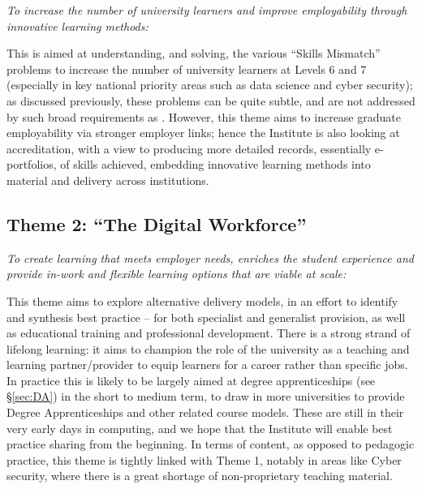 \documentclass[conference]{IEEEtran}
\begin{document}
{\emph{To increase the number of university learners and improve
employability through innovative learning methods:}}\newline

\noindent This is aimed at understanding, and solving, the various
``Skills Mismatch'' problems to increase the number of university
learners at Levels 6 and 7 (especially in key national priority areas
such as data science and cyber security); as discussed previously,
these problems can be quite subtle, and are not addressed by such
broad requirements as \cite[Requirement 2.3.1]{BCS2018a}. However,
this theme aims to increase graduate employability via stronger
employer links; hence the Institute is also looking at accreditation,
with a view to producing more detailed records, essentially
e-portfolios, of skills achieved, embedding innovative learning
methods into material and delivery across institutions.


\subsection{Theme 2: ``The Digital Workforce''}

{\emph{To create learning that meets employer needs, enriches the
student experience and provide in-work and flexible learning options
that are viable at scale:}}\newline

\noindent This theme aims to explore alternative delivery models, in
an effort to identify and synthesis best practice -- for both
specialist and generalist provision, as well as educational training
and professional development. There is a strong strand of lifelong
learning: it aims to champion the role of the university as a teaching
and learning partner/provider to equip learners for a career rather
than specific jobs. In practice this is likely to be largely aimed at
degree apprenticeships (see \S\ref{sec:DA}) in the short to medium
term, to draw in more universities to provide Degree Apprenticeships
and other related course models. These are still in their very early
days in computing, and we hope that the Institute will enable best
practice sharing from the beginning. In terms of content, as opposed
to pedagogic practice, this theme is tightly linked with Theme 1,
notably in areas like Cyber security, where there is a great shortage
of non-proprietary teaching material.
\end{document}
